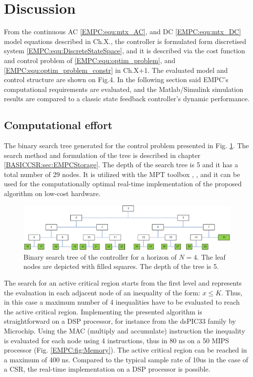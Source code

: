 \section{Discussion}\label{EMPC:sec:Discussion}

    From the continuous AC \ref{EMPC:equ:mtx_AC}, and DC \ref{EMPC:equ:mtx_DC} model equations described in Ch.X., the controller is formulated form discretised system \ref{EMPC:equ:DiscreteStateSpace}, and it is described via the cost function and control problem of \ref{EMPC:equ:optim_problem}, and \ref{EMPC:equ:optim_problem_constr} in Ch.X$+$1. The evaluated model and control structure are shown on Fig.4. In the following section said EMPC’s computational requirements are evaluated, and the Matlab/Simulink simulation results are compared to a classic state feedback controller’s dynamic performance.

    \subsection{Computational effort}\label{EMPC:sec:CompEffort}

    The binary search tree generated for the control problem presented in Fig. \ref{EMPC:fig:SearchTree}. The search method and formulation of the tree is described in chapter \ref{BASICCSR:sec:EMPCStorage}. The depth of the search tree is 5 and it has a total number of 29 nodes. It is utilized with the MPT toolbox \cite{muthukumar2016adaptive}, \cite{kutasi2010constrained}, and it can be used for the computationally optimal real-time implementation of the proposed algorithm on low-cost hardware.

    \begin{figure}[!ht]
        \centering
        \includegraphics[width=\textwidth]{EMPC_PNG_Pics/SearchTree.png}
        \caption{Binary search tree of the controller for a horizon of $N = 4$. The leaf nodes are depicted with filled squares. The depth of the tree is 5.}
        \label{EMPC:fig:SearchTree}
    \end{figure}

    The search for an active critical region starts from the first level and represents the evaluation in each adjacent node of an inequality of the form: $x\leq K$. Thus, in this case a maximum number of 4 inequalities have to be evaluated to reach the active critical region. Implementing the presented algorithm is straightforward on a DSP processor, for instance from the dsPIC33 family by Microchip. Using the MAC (multiply and accumulate) instruction the inequality is evaluated for each node using 4 instructions, thus in 80 ns on a 50 MIPS processor (Fig. \ref{EMPC:fig:Memory}). The active critical region can be reached in a maximum of 400 ns. Compared to the typical sample rate of 10us in the case of a CSR, the real-time implementation on a DSP processor is possible.

